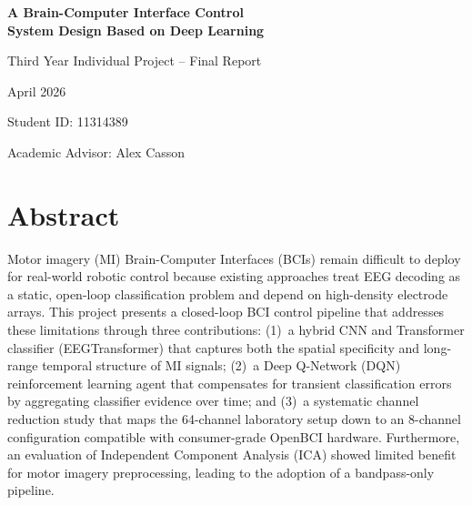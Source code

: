 \documentclass[12pt, a4paper]{article}
\begin{document}
\raggedright

\begin{titlepage}
    \centering
    \vspace*{3cm}
    {\LARGE \textbf{A Brain-Computer Interface Control \\ System Design Based on Deep Learning}\par}
    \vspace{1.5cm}
    {\Large Third Year Individual Project -- Final Report\par}
    \vspace{2.5cm}
    {\large April 2026\par}
    \vspace{2cm}
    {\large Student ID: 11314389\par}
    \vfill
    {\large Academic Advisor: Alex Casson\par}
\end{titlepage}

\setcounter{page}{2}

\begin{singlespace}
\tableofcontents
\end{singlespace}
\clearpage

\section*{Abstract}
Motor imagery (MI) Brain-Computer Interfaces (BCIs) remain difficult to deploy for real-world robotic control because existing approaches treat EEG decoding as a static, open-loop classification problem and depend on high-density electrode arrays. This project presents a closed-loop BCI control pipeline that addresses these limitations through three contributions: (1)~a hybrid CNN and Transformer classifier (EEGTransformer) that captures both the spatial specificity and long-range temporal structure of MI signals; (2)~a Deep Q-Network (DQN) reinforcement learning agent that compensates for transient classification errors by aggregating classifier evidence over time; and (3)~a systematic channel reduction study that maps the 64-channel laboratory setup down to an 8-channel configuration compatible with consumer-grade OpenBCI hardware. Furthermore, an evaluation of Independent Component Analysis (ICA) showed limited benefit for motor imagery preprocessing, leading to the adoption of a bandpass-only pipeline.
\end{document}

